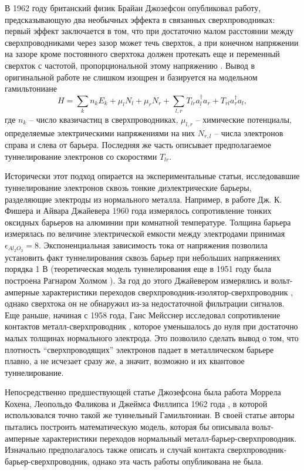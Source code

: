 \documentclass[14pt, a4paper]{extreport}
\numberwithin{equation}{section}
\begin{document}
В 1962 году британский физик Брайан Джозефсон опубликовал работу, предсказывающую два необычных эффекта в связанных сверхпроводниках: первый эффект заключается в том, что при достаточно малом расстоянии между сверхпроводниками через зазор может течь сверхток, а при конечном напряжении на зазоре кроме постоянного сверхтока должен протекать еще и переменный сверхток с частотой, пропорциональной этому напряжению \cite{josephson1962possible}. Вывод в оригинальной работе не слишком изощрен и базируется на модельном гамильтониане
\begin{equation}
	H = \sum_k n_k E_k + \mu_l N_l + \mu_r N_r + \sum_{l,r} T_{lr}a^\dag_l a_r + T_{rl} a^\dag_r a_l, \label{eq:josephson_tunnel}
\end{equation}
где $n_k$ -- число квазичастиц в сверхпроводниках, $\mu_{l,r}$ -- химические потенциалы, определяемые электрическими напряжениями на них $N_{r,l}$ -- числа электронов справа и слева от барьера. Последняя же часть описывает предполагаемое туннелирование электронов со скоростями $T_{lr}$. 

Исторически этот подход опирается на экспериментальные статьи, исследовавшие туннелирование электронов сквозь тонкие диэлектрические барьеры, разделяющие электроды из нормального металла. Например, в работе Дж. К. Фишера и Айвара Джайевера 1960 года  \cite{fisher1961tunneling} измерялось сопротивление тонких оксидных барьеров на алюминии при комнатной температуре. Толщина барьера измерялась по величине электрической емкости между электродами принимая $\epsilon_{Al_2O_3} = 8$. Экспоненциальная зависимость тока от напряжения позволила установить факт туннелирования сквозь барьер при небольших напряжениях порядка 1 В (теоретическая модель туннелирования еще в 1951 году была построена Рагнаром Холмом \cite{holm1951electric}). За год до этого Джайевером измерялись и вольт-амперные характеристики переходов сверхпроводник-изолятор-сверхпроводник \cite{giaever1960energy, giaever1960electron}, однако сверхтока он не обнаружил из-за недостаточной фильтрации сигналов. Еще раньше, начиная с 1958 года, Ганс Мейсснер исследовал сопротивление контактов металл-сверхпроводник \cite{meissner1958measurements, meissner1960superconductivity}, которое уменьшалось до нуля при достаточно малых толщинах нормального электрода. Это позволило сделать вывод о том, что плотность ``сверхпроводящих'' электронов падает в металлическом барьере плавно, а не исчезает сразу же, а значит, возможно и их квантовое туннелирование.

Непосредственно предшествующей статье Джозефсона была работа Моррела Кохена, Леопольдо Фаликова и Джеймса Филлипса 1962 года \cite{cohen1962superconductive}, в которой использовался точно такой же туннельный Гамильтониан. В своей статье авторы пытались построить математическую модель, которая бы описывала вольт-амперные характеристики переходов нормальный металл-барьер-сверхпроводник. Изначально предполагалось также описать и случай контакта сверхпроводник-барьер-сверхпроводник, однако эта часть работы опубликована не была. 
\end{document}
